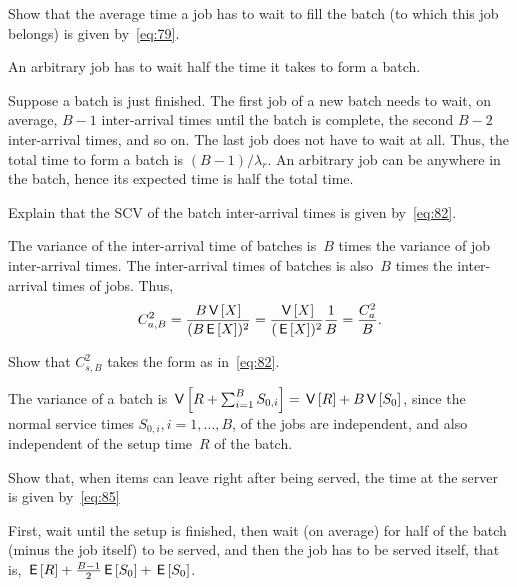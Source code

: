 \documentclass[queueing-book.tex]{subfiles}
\begin{document}
\begin{exercise}\label{ex:48}
  Show that the average time a job has to wait to fill the batch (to which this job belongs) is given by~\cref{eq:79}.
\begin{hint}
An arbitrary job has to wait half the time it takes  to form a batch.
 \end{hint}
\begin{solution}
  Suppose a batch is just finished.
  The first job of a new batch needs to wait, on average, $B-1$ inter-arrival times until the batch is complete, the second $B-2$ inter-arrival times, and so on.
  The last job does not have to wait at all.
  Thus, the total time to form a batch is $(B-1)/\lambda_r$.
  An arbitrary job can be anywhere in the batch, hence its expected time is half the total time.
\end{solution}
\end{exercise}


\begin{exercise}\label{ex:490}
Explain that the SCV of the batch inter-arrival times is given by~\cref{eq:82}.
\begin{solution}
The variance of the inter-arrival time of batches is~$B$ times the variance of job inter-arrival times. The inter-arrival times of batches is also~$B$ times the inter-arrival times of jobs. Thus,
\begin{equation*}
 C_{a,B}^2 = \frac{B \,\mathsf{V}\left[X\right]}{(B \,\mathsf{E}\left[X\right])^2} = \frac{\,\mathsf{V}\left[X\right]}{(\,\mathsf{E}\left[X\right])^2} \frac 1 B = \frac{C_a^2}{B}.
\end{equation*}
\end{solution}
\end{exercise}


\begin{exercise}\label{ex:491}
Show that $C_{s,B}^2$ takes the form as in~\cref{eq:82}.
\begin{solution}
 The variance of a batch is $\,\mathsf{V}\left[R+\sum_{i=1}^B S_{0,i} \right] = \,\mathsf{V}\left[R\right] + B\,\mathsf{V}\left[S_0\right]$, since the normal service times $S_{0,i}, i=1,\ldots,B$, of the jobs are independent, and also independent of the setup time~$R$ of the batch.
\end{solution}
\end{exercise}

\begin{exercise}\label{ex:492}
Show that, when items can leave right after being served, the time at the server is given by~\cref{eq:85}
\begin{solution}
 First, wait until the setup is finished, then wait (on average) for half of the batch (minus the job itself) to be served, and then the job has to be served itself, that is,
$\,\mathsf{E}\left[R\right] + \frac{B-1}{2}\,\mathsf{E}\left[S_0\right] +\,\mathsf{E}\left[S_0\right]$.
\end{solution}
\end{exercise}




\end{document}
